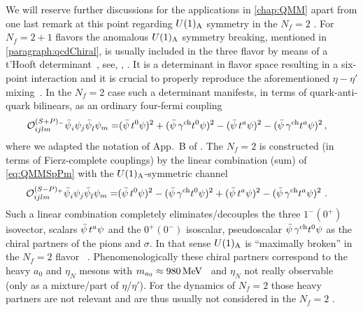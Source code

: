 We will reserve further discussions for the applications in \cref{chap:QMM} apart from one last remark at this point regarding $U(1)_{\mathrm{A}}$ symmetry in the $N_f=2$ \qmm{}.
For $N_f=2+1$ flavors the anomalous $U(1)_{\mathrm{A}}$ symmetry breaking, mentioned in \cref{paragraph:qcdChiral}, is usually included in the three flavor \qmm{} by means of a t'Hooft determinant~\cite{tHooft:1976rip}, see, \eg{}, .
It is a determinant in flavor space resulting in a six-point interaction and it is crucial to properly reproduce the aforementioned $\eta-\eta'$ mixing~\cite{Kobayashi:1970ji,Kobayashi:1971qz,DelDebbio:2004ns,Luscher:2010ik,Ce:2014sfa}.
In the $N_f=2$ case such a determinant manifests, in terms of quark-anti-quark bilinears, as an ordinary four-fermi coupling
\begin{align}
 \mathcal{O}^{(S+P)_{-}}_{ijlm}{\bar{\psi}}_i\psi_j{\bar{\psi}}_l\psi_m=&(\bar{\psi}\,t^0 \psi)^2+(\bar{\psi}\,\gamma^{\mathrm{ch}} t^0 \psi)^2 -(\bar{\psi}\,t^a \psi)^2-(\bar{\psi}\,\gamma^{\mathrm{ch}} t^a \psi)^2\,,\label{eq:QMMSpPm}
\end{align}
where we adapted the notation of App.~B of .
The $N_f=2$ \qmm{} is constructed (in terms of Fierz-complete couplings) by the linear combination (sum) of \cref{eq:QMMSpPm} with the $U(1)_{\mathrm{A}}$-symmetric channel
\begin{align}
 \mathcal{O}^{(S-P)_{+}}_{ijlm}{\bar{\psi}}_i\psi_j{\bar{\psi}}_l\psi_m=&(\bar{\psi}\,t^0 \psi)^2-(\bar{\psi}\,\gamma^{\mathrm{ch}} t^0 \psi)^2+(\bar{\psi}\,t^a \psi)^2-(\bar{\psi}\,\gamma^{\mathrm{ch}} t^a \psi)^2\,\label{eq:QMMSmPp}\, .
\end{align}
Such a linear combination completely eliminates/decouples the three $1^-(0^+)$ isovector, scalars $\bar{\psi}\,t^a \psi$ and the $0^+(0^-)$ isoscalar, pseudoscalar $\bar{\psi}\,\gamma^{\mathrm{ch}} t^0 \psi$ as the chiral partners of the pions and $\sigma$.
In that sense $U(1)_{\mathrm{A}}$ is ``maximally broken'' in the $N_f=2$ flavor \qmm{}~\cite{Rennecke:2015lur}.
Phenomenologically these chiral partners correspond to the heavy $a_0$ and $\eta_N$ mesons \dash{} with $m_{a_0}\approx 980\,\mathrm{MeV}$~\cite{ParticleDataGroup2022Aug} and $\eta_N$ not really observable (only as a mixture/part of $\eta$/$\eta'$).
For the dynamics of $N_f=2$ \csb{} those heavy partners are not relevant and are thus usually not considered in the $N_f=2$ \qmm{}.